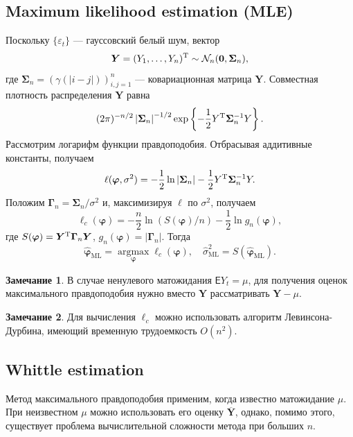 \documentclass[specialist,
substylefile = spbu_report.rtx,
subf,href,colorlinks=true, 12pt]{disser}
\theoremstyle{definition}
\newtheorem{remark}{Замечание}[section]
\begin{document}
\subsection{Maximum likelihood estimation (MLE)}
Поскольку $\{\varepsilon_t\}$ --- гауссовский белый шум, вектор
\[
	\bm Y=(Y_1,\ldots,Y_n)^{\mathrm{T}}\sim \mathcal{N}_n(\bm0, \bm\Sigma_n),
\]
где $\bm\Sigma_n=(\gamma(|i-j|))_{i,j=1}^n$ --- ковариационная матрица $\bm Y$. Совместная плотность распределения $\bm Y$ равна
\[
	(2\pi)^{-n/2}\left|\bm\Sigma_n\right|^{-1/2}\exp\left\{-\frac12Y^{\mathrm{T}}\bm\Sigma_n^{-1}Y\right\}.
\]
Рассмотрим логарифм функции правдоподобия. Отбрасывая аддитивные константы, получаем
\[
	\ell(\bm\varphi, \sigma^2)=-\frac12\ln\left|\bm\Sigma_n\right|-\frac12 Y^{\mathrm{T}} \bm\Sigma_n^{-1} Y.
\]
Положим $\bm\Gamma_n=\bm\Sigma_n / \sigma^2$ и, максимизируя $\ell$ по $\sigma^2$, получаем
\[
	\ell_c(\bm\varphi)=-\frac{n}{2}\ln\left(S(\bm\varphi) / n\right) - \frac{1}{2}\ln g_n(\bm\varphi),
\]
где $S(\bm\varphi)=\bm Y^{\mathrm{T}} \bm\Gamma_n\bm Y$, $g_n(\bm\varphi)=\left|\bm\Gamma_n\right|$.
Тогда
\[
	\widehat{\bm\varphi}_\mathrm{ML}=\operatorname*{argmax}\limits_{\bm\varphi}\ell_c(\bm\varphi),\quad \widehat\sigma^2_\mathrm{ML} = S(\widehat{\bm\varphi}_\mathrm{ML}).
\]

\begin{remark}
	В случае ненулевого матожидания $\mathsf{E}Y_t=\mu$, для получения оценок максимального правдоподобия нужно вместо $\bm Y$ рассматривать $\bm Y-\mu$.
\end{remark}
\begin{remark}
	Для вычисления $\ell_c$ можно использовать алгоритм Левинсона-Дурбина, имеющий временную трудоемкость $O(n^2)$.
\end{remark}
\subsection{Whittle estimation}
Метод максимального правдоподобия применим, когда известно матожидание $\mu$. При неизвестном $\mu$ можно использовать его оценку $\overline{\bm Y}$, однако, помимо этого, существует проблема вычислительной сложности метода при больших $n$.
\end{document}
